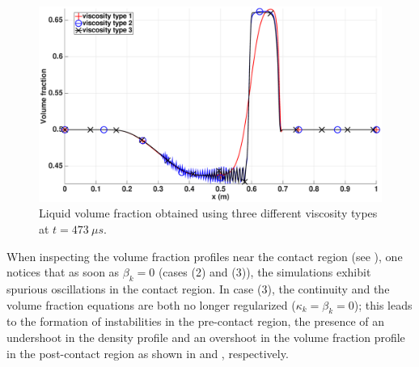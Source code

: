%
\begin{figure}[H]
        \centering
        \includegraphics[width=\textwidth]{figures/relaxation_liquid_vf_multiple_visc.eps}
        \caption{Liquid volume fraction obtained using three different viscosity types at $t=473 \ \mu s$.}
        \label{fig:liq-vf}
\end{figure}
%
When inspecting the volume fraction profiles near the contact region (see ), one notices that as soon as $\beta_k=0$ 
(cases (2) and (3)), the simulations exhibit spurious oscillations in the contact region. 
In case (3), the continuity and the volume fraction equations are both no longer regularized ($\kappa_k=\beta_k=0$); this leads to 
the formation of instabilities in the pre-contact region, the presence of an undershoot in the density profile and an overshoot in the volume fraction profile in the post-contact region as shown in  and , respectively. 

%
